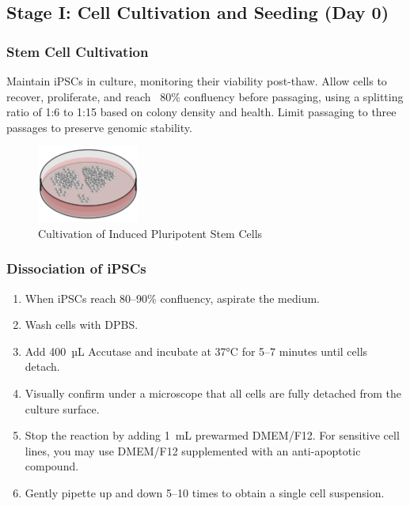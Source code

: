 \documentclass[11pt]{article}
\begin{document}
\subsection{Stage I: Cell Cultivation and Seeding (Day 0)}

\subsubsection{Stem Cell Cultivation}
Maintain iPSCs in culture, monitoring their viability post-thaw. Allow cells to recover, proliferate, and reach ~80\% confluency before passaging, using a splitting ratio of 1:6 to 1:15 based on colony density and health. Limit passaging to three passages to preserve genomic stability.

\begin{figure}[H]
    \centering
    \includegraphics[width=0.3\textwidth]{6.png}
    \caption{Cultivation of Induced Pluripotent Stem Cells}
    \label{fig:stem_cell_cultivation}
\end{figure}

\subsubsection{Dissociation of iPSCs}
\begin{enumerate}[leftmargin=*]
    \item When iPSCs reach 80–90\% confluency, aspirate the medium.
    \item Wash cells with DPBS.
    \item Add 400~µL Accutase and incubate at 37°C for 5–7 minutes until cells detach.
    \item {Visually confirm under a microscope that all cells are fully detached from the culture surface.}
    \item Stop the reaction by adding 1~mL prewarmed DMEM/F12. For sensitive cell lines, you may use DMEM/F12 supplemented with an anti-apoptotic compound.
    \item Gently pipette up and down 5–10 times to obtain a single cell suspension.
\end{enumerate}
\end{document}
